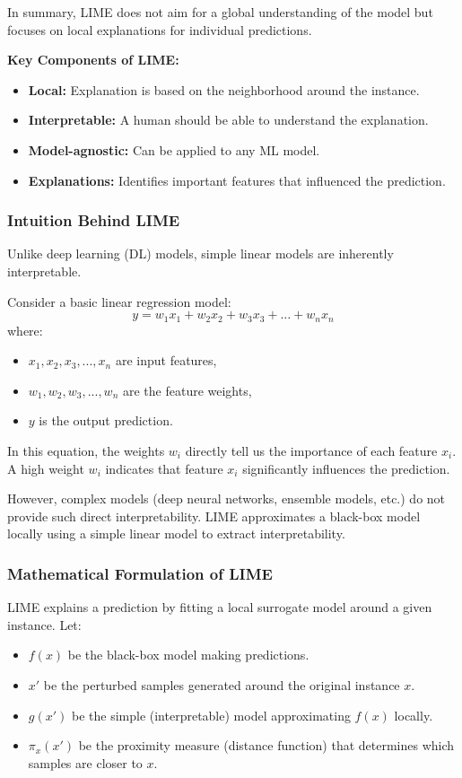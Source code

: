 In summary, LIME does not aim for a global understanding of the model but focuses on local explanations for individual predictions.

\textbf{Key Components of LIME:}
\begin{itemize}
    \item \textbf{Local:} Explanation is based on the neighborhood around the instance.
    \item \textbf{Interpretable:} A human should be able to understand the explanation.
    \item \textbf{Model-agnostic:} Can be applied to any ML model.
    \item \textbf{Explanations:} Identifies important features that influenced the prediction.
\end{itemize}

\subsubsection{Intuition Behind LIME}
Unlike deep learning (DL) models, simple linear models are inherently interpretable. 

Consider a basic linear regression model:
\begin{equation}
    y = w_1x_1 + w_2x_2 + w_3x_3 + \dots + w_nx_n
\end{equation}
where:
\begin{itemize}
    \item \( x_1, x_2, x_3, ..., x_n \) are input features,
    \item \( w_1, w_2, w_3, ..., w_n \) are the feature weights,
    \item \( y \) is the output prediction.
\end{itemize}

In this equation, the weights \( w_i \) directly tell us the importance of each feature \( x_i \). A high weight \( w_i \) indicates that feature \( x_i \) significantly influences the prediction.

However, complex models (deep neural networks, ensemble models, etc.) do not provide such direct interpretability. LIME approximates a black-box model locally using a simple linear model to extract interpretability.

\subsubsection{Mathematical Formulation of LIME}
LIME explains a prediction by fitting a local surrogate model around a given instance. Let:
\begin{itemize}
    \item \( f(x) \) be the black-box model making predictions.
    \item \( x' \) be the perturbed samples generated around the original instance \( x \).
    \item \( g(x') \) be the simple (interpretable) model approximating \( f(x) \) locally.
    \item \( \pi_x(x') \) be the proximity measure (distance function) that determines which samples are closer to \( x \).
\end{itemize}

